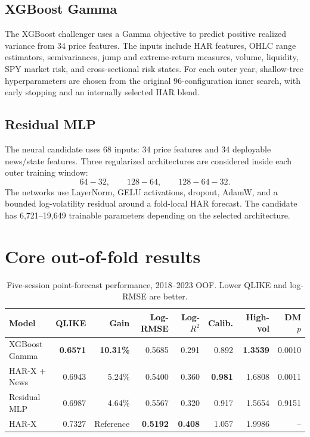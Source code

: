 \documentclass[10pt]{article}
\begin{document}
\subsection{XGBoost Gamma}

The XGBoost challenger uses a Gamma objective to predict positive realized
variance from 34 price features. The inputs include HAR features, OHLC
range estimators, semivariances, jump and extreme-return measures, volume,
liquidity, SPY market risk, and cross-sectional risk states. For each outer
year, shallow-tree hyperparameters are chosen from the original 96-configuration
inner search, with early stopping and an internally selected HAR blend.

\subsection{Residual MLP}

The neural candidate uses 68 inputs: 34 price features and 34 deployable
news/state features. Three regularized architectures are considered inside
each outer training window:
\[
64\!-\!32,\qquad 128\!-\!64,\qquad 128\!-\!64\!-\!32.
\]
The networks use LayerNorm, GELU activations, dropout, AdamW, and a bounded
log-volatility residual around a fold-local HAR forecast. The candidate has
6,721--19,649 trainable parameters depending on the selected architecture.

\section{Core out-of-fold results}

\begin{table}[ht]
\centering
\caption{Five-session point-forecast performance, 2018--2023 OOF.
Lower QLIKE and log-RMSE are better.}
\small
\begin{tabular}{lrrrrrrr}
\toprule
Model & QLIKE & Gain & Log-RMSE & Log-\(R^2\) & Calib. & High-vol & DM \(p\) \\
\midrule
XGBoost Gamma
  & \textbf{0.6571} & \textbf{10.31\%} & 0.5685 & 0.291 & 0.892 & \textbf{1.3539} & 0.0010 \\
HAR-X + News
  & 0.6943 & 5.24\% & 0.5400 & 0.360 & \textbf{0.981} & 1.6808 & 0.0011 \\
Residual MLP
  & 0.6987 & 4.64\% & 0.5567 & 0.320 & 0.917 & 1.5654 & 0.9151 \\
HAR-X
  & 0.7327 & Reference & \textbf{0.5192} & \textbf{0.408} & 1.057 & 1.9986 & -- \\
\bottomrule
\end{tabular}
\end{table}
\end{document}
